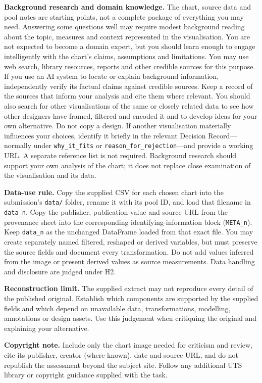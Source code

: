 \documentclass[11pt,a4paper]{article}
\newcommand{\labelbox}[1]{\colorbox{panel}{\texttt{\small #1}}}
\begin{document}
\textbf{Background research and domain knowledge.} The chart, source data and
pool notes are starting points, not a complete package of everything you may
need. Answering some questions well may require modest background reading about
the topic, measures and context represented in the visualisation. You are not
expected to become a domain expert, but you should learn enough to engage
intelligently with the chart's claims, assumptions and limitations. You may use
web search, library resources, reports and other credible sources for this
purpose. If you use an AI system to locate or explain background information,
independently verify its factual claims against credible sources. Keep a record
of the sources that inform your analysis and cite them where relevant.
You should also search for other visualisations of the same or closely related
data to see how other designers have framed, filtered and encoded it and to
develop ideas for your own alternative. Do not copy a design. If another
visualisation materially influences your choices, identify it briefly in the
relevant Decision Record---normally under
\labelbox{why\_it\_fits} or \labelbox{reason\_for\_rejection}---and provide a
working URL. A separate reference list is not required.
Background research should support your own analysis of the chart; it does not
replace close examination of the visualisation and its data.

\textbf{Data-use rule.} Copy the supplied CSV for each chosen chart into the
submission's \labelbox{data/} folder, rename it with its pool ID, and load that
filename in \labelbox{data\_n}. Copy the publisher, publication value and
source URL from the provenance sheet into the corresponding
identifying-information block (\labelbox{META\_n}). Keep \labelbox{data\_n} as
the unchanged DataFrame loaded from that exact file. You may create separately
named filtered, reshaped or derived variables, but must preserve the source
fields and document every transformation. Do not add values inferred
from the image or present derived values as source measurements. Data handling
and disclosure are judged under H2.

\textbf{Reconstruction limit.} The supplied extract may not reproduce every
detail of the published original. Establish which components are supported by
the supplied fields and which depend on unavailable data, transformations,
modelling, annotations or design assets. Use this judgement when critiquing the
original and explaining your alternative.

\textbf{Copyright note.} Include only the chart image needed for criticism and
review, cite its publisher, creator (where known), date and source URL, and do
not republish the assessment beyond the subject site. Follow any additional
UTS library or copyright guidance supplied with the task.
\end{document}
